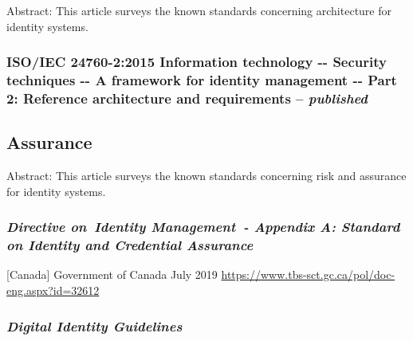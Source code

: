 Abstract: This article surveys the known standards concerning
architecture for identity systems.

\hypertarget{isoiec-24760-22015-information-technology----security-techniques----a-framework-for-identity-management----part-2-reference-architecture-and-requirements-published}{%
\subsubsection{\texorpdfstring{ISO/IEC 24760-2:2015 Information technology
-\/- Security techniques -\/- A framework for identity management -\/-
Part 2: Reference architecture and requirements --
\emph{published}}{ISO/IEC 24760-2:2015 Information technology -\/- Security techniques -\/- A framework for identity management -\/- Part 2: Reference architecture and requirements -- published}}\label{isoiec-24760-22015-information-technology----security-techniques----a-framework-for-identity-management----part-2-reference-architecture-and-requirements-published}}

\hypertarget{assurance}{%
\subsection{Assurance}\label{assurance}}

Abstract: This article surveys the known standards concerning risk and
assurance for identity systems.

\hypertarget{directive-on-identity-management---appendix-a-standard-on-identity-and-credential-assurance}{%
\subsubsection{\texorpdfstring{\emph{Directive on~Identity Management~-
Appendix A: Standard on Identity and Credential
Assurance}}{Directive on~Identity Management~- Appendix A: Standard on Identity and Credential Assurance}}\label{directive-on-identity-management---appendix-a-standard-on-identity-and-credential-assurance}}

{[}Canada{]} Government of Canada July 2019
\url{https://www.tbs-sct.gc.ca/pol/doc-eng.aspx?id=32612}

\hypertarget{digital-identity-guidelines}{%
\subsubsection{\texorpdfstring{\emph{Digital Identity
Guidelines}}{Digital Identity Guidelines}}\label{digital-identity-guidelines}}

